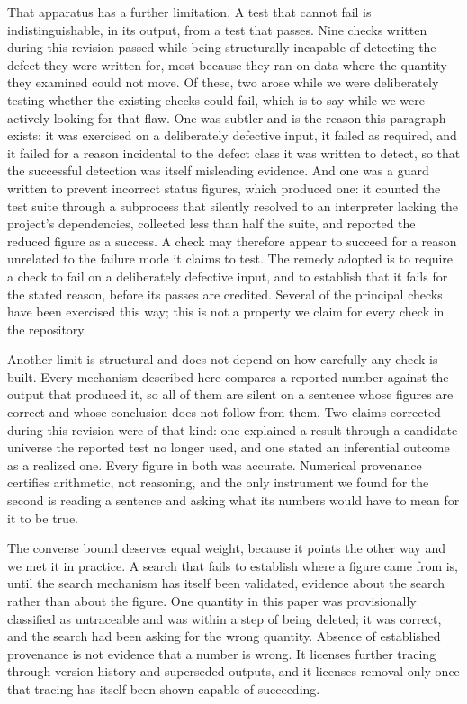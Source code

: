 \documentclass[11pt]{article}
\begin{document}
That apparatus has a further limitation. A test that cannot fail is indistinguishable, in its output, from a test that passes. Nine checks written during this revision passed while being structurally incapable of detecting the defect they were written for, most because they ran on data where the quantity they examined could not move. Of these, two arose while we were deliberately testing whether the existing checks could fail, which is to say while we were actively looking for that flaw. One was subtler and is the reason this paragraph exists: it was exercised on a deliberately defective input, it failed as required, and it failed for a reason incidental to the defect class it was written to detect, so that the successful detection was itself misleading evidence. And one was a guard written to prevent incorrect status figures, which produced one: it counted the test suite through a subprocess that silently resolved to an interpreter lacking the project's dependencies, collected less than half the suite, and reported the reduced figure as a success. A check may therefore appear to succeed for a reason unrelated to the failure mode it claims to test. The remedy adopted is to require a check to fail on a deliberately defective input, and to establish that it fails for the stated reason, before its passes are credited. Several of the principal checks have been exercised this way; this is not a property we claim for every check in the repository.

Another limit is structural and does not depend on how carefully any check is built. Every mechanism described here compares a reported number against the output that produced it, so all of them are silent on a sentence whose figures are correct and whose conclusion does not follow from them. Two claims corrected during this revision were of that kind: one explained a result through a candidate universe the reported test no longer used, and one stated an inferential outcome as a realized one. Every figure in both was accurate. Numerical provenance certifies arithmetic, not reasoning, and the only instrument we found for the second is reading a sentence and asking what its numbers would have to mean for it to be true.

The converse bound deserves equal weight, because it points the other way and we met it in practice. A search that fails to establish where a figure came from is, until the search mechanism has itself been validated, evidence about the search rather than about the figure. One quantity in this paper was provisionally classified as untraceable and was within a step of being deleted; it was correct, and the search had been asking for the wrong quantity. Absence of established provenance is not evidence that a number is wrong. It licenses further tracing through version history and superseded outputs, and it licenses removal only once that tracing has itself been shown capable of succeeding.
\end{document}
